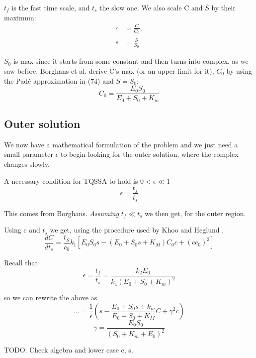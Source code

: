 \documentclass[12pt]{article}
\begin{document}
$t_f$ is the fast time scale, and $t_s$ the slow one. We also scale C and
$\overline{S}$ by their maximum:
\begin{align}
c &= \frac{C}{C_0}, \\
s &= \frac{\overline{S}}{S_0}
\end{align}

$S_0$ is max since it starts from some constant and then turns into
complex, as we saw before. Borghans et al. derive C's max (or an upper
limit for it), $C_0$ by using the Pad\'{e} approximation in (74) and
$S=S_0$:
\begin{equation}
C_0 = \frac{E_0 S_0}{E_0 + S_0 + K_m}
\end{equation}

\subsection{Outer solution}

We now have a mathematical formulation of the problem and we just need a small
parameter $\epsilon$ to begin looking for the outer solution, where the complex
changes slowly.

A necessary condition for TQSSA to hold is $0 < \epsilon \ll 1$
\begin{equation}
\epsilon = \frac{t_f}{t_s}
\end{equation}

This comes from Borghans. \textit{Assuming} $t_f \ll t_s$ we then get, for the
outer region.

Using c and $t_s$ we get, using the procedure used by Khoo and Heglund
\cite{khoo2008total},
\begin{equation}
\frac{dC}{dt_s} = \frac{t_{\overline{S}}}{c_0} k_1 [E_0 S_0 s - (E_0 + S_0 s +
K_M) C_0 c + (c c_0)^2]
\end{equation}

Recall that
\begin{equation}
\epsilon = \frac{t_f}{t_s} = \frac{k_2 E_0}{k_1(E_0+S_0+K_m)^2}
\end{equation}

so we can rewrite the above as
\begin{equation}
... = \frac{1}{\epsilon} (s - \frac{E_0+S_0 s + k_m}{E_0 + S_0+ K_M}C + \gamma^2
c)
\end{equation}
\begin{equation}
\gamma = \frac{E_0 S_0}{(S_0 + K_m + E_0)^2}
\end{equation}

TODO: Check algebra and lower case c, s.
\end{document}

